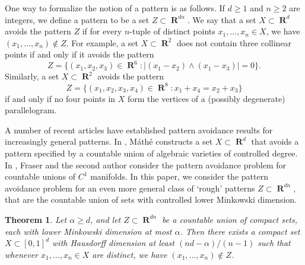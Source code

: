 \documentclass[dvipsnames,letterpaper,12pt]{article}
\numberwithin{equation}{section}
\theoremstyle{plain}
\newtheorem{theorem}{Theorem}
\theoremstyle{remark}
\DeclareMathOperator{\RR}{\mathbf{R}}
\DeclareMathOperator{\setcolon}{\colon}
\begin{document}
One way to formalize the notion of a pattern is as follows. If $d \geq 1$ and $n \geq 2$ are integers, we define a pattern to be a set $Z \subset \RR^{dn}$. We say that a set $X \subset \RR^d$ avoids the pattern $Z$ if for every $n$-tuple of distinct points $x_1, \ldots, x_n\in X$, we have $(x_1,\ldots,x_n) \not \in Z$. For example, a set $X \subset \RR^2$ does not contain three collinear points if and only if it avoids the pattern
%
\[ Z = \{ (x_1,x_2,x_3) \in \RR^{6} \setcolon |(x_1-x_2)\wedge (x_1-x_3)|=0\}. \]
%
Similarly, a set $X \subset \RR^2$ avoids the pattern
%
\[ Z = \{ (x_1, x_2,x_3,x_4) \in \RR^8 \setcolon x_1 + x_4 = x_2 + x_3 \} \]
%
if and only if no four points in $X$ form the vertices of a (possibly degenerate) parallelogram.

A number of recent articles have established pattern avoidance results for increasingly general patterns. In \cite{Mathe}, M\'{a}th\'{e} constructs a set $X\subset\RR^d$ that avoids a pattern specified by a countable union of algebraic varieties of controlled degree. In \cite{MalabikaRob}, Fraser and the second author consider the pattern avoidance problem for countable unions of $C^1$ manifolds. In this paper, we consider the pattern avoidance problem for an even more general class of `rough' patterns $Z \subset \RR^{dn}$, that are the countable union of sets with controlled lower Minkowski dimension.
%

\begin{theorem}\label{mainTheorem}
	Let $\alpha \geq d$, and let $Z \subset \RR^{dn}$ be a countable union of compact sets, each with lower Minkowski dimension at most $\alpha$. Then there exists a compact set $X \subset [0,1]^d$ with Hausdorff dimension at least $(nd - \alpha)/(n-1)$ such that whenever $x_1, \dots, x_n \in X$ are distinct, we have $(x_1, \dots, x_n) \not \in Z$.
\end{theorem}
\end{document}
